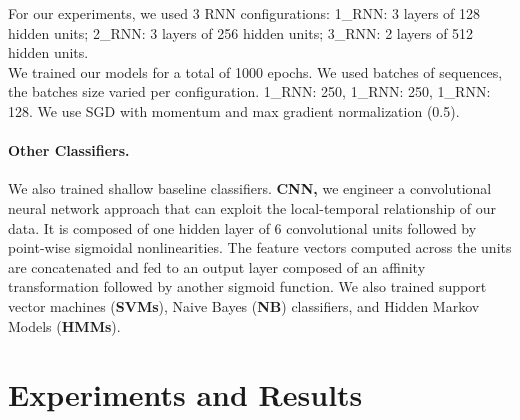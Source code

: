 \documentclass{llncs}
\begin{document}
  For  our experiments, we used 3 RNN configurations: 1\_RNN: 3 layers of 128 hidden units;  2\_RNN: 3 layers of 256 hidden units;  3\_RNN: 2 layers of 512 hidden units.\\
  We trained our models for a total of 1000 epochs. We used batches of sequences, the batches size varied per configuration. 1\_RNN: 250, 1\_RNN: 250, 1\_RNN: 128. We use SGD with momentum and max gradient normalization (0.5).

  \vspace*{-\baselineskip}
  \paragraph{Other Classifiers.} We also trained shallow baseline classifiers. {\bf CNN,} we engineer a convolutional neural network approach that can exploit the local-temporal relationship of our data.  It is composed of one hidden layer of 6 convolutional units followed by point-wise sigmoidal nonlinearities. The feature vectors computed across the units are concatenated and fed to an output layer composed of an affinity transformation followed by another sigmoid function. We also trained support vector machines ({\bf SVMs}), Naive Bayes ({\bf NB}) classifiers, and Hidden Markov Models ({\bf HMMs}). %
  \vspace*{-\baselineskip}
  \section{Experiments and Results}
\end{document}
